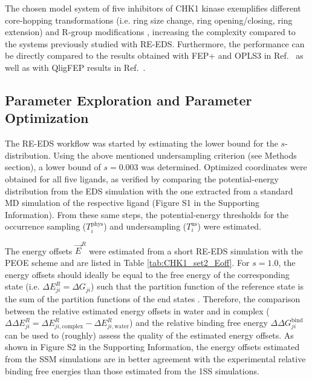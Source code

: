 The chosen model system of five inhibitors of CHK1 kinase exemplifies different core-hopping transformations (i.e. ring size change, ring opening/closing, ring extension) and R-group modifications \cite{Wang2017}, increasing the complexity compared to the systems previously studied with RE-EDS. Furthermore, the performance can be directly compared to the results obtained with FEP+ and OPLS3 in Ref.~\cite{Wang2017} as well as with QligFEP results in Ref.~\cite{Jespers2019}.

\subsection{Parameter Exploration and Parameter Optimization}
The RE-EDS workflow was started by estimating the lower bound for the $s$-distribution. Using the above mentioned undersampling criterion (see Methods section), a lower bound of $s=0.003$ was determined. 
Optimized coordinates were obtained for all five ligands, as verified by comparing the potential-energy distribution from the EDS simulation with the one extracted from a standard MD simulation of the respective ligand (Figure S1 in the Supporting Information). %
From these same steps, the potential-energy thresholds for the occurrence sampling ($T_{i}^{\text{phys}}$) and undersampling ($T_{i}^{\text{us}}$) were estimated.

The energy offsets $\vec{E}^R$ were estimated from a short RE-EDS simulation with the PEOE \cite{Sidler2016} scheme and are listed in Table \ref{tab:CHK1_set2_Eoff}.
For $s=1.0$, the energy offsets should ideally be equal to the free energy of the corresponding state (i.e. $\Delta E^R_{ji} = \Delta G_{ji}$) such that the partition function of the reference state is the sum of the partition functions of the end states \cite{Christ2008}. Therefore, the comparison between the relative estimated energy offsets in water and in complex ($\Delta \Delta E^R_{ji} = \Delta E^R_{ji,\text{complex}} - \Delta E^R_{ji,\text{water}}$) and the relative binding free energy $\Delta \Delta G^\text{bind}_{ji}$ can be used to (roughly) assess the quality of the estimated energy offsets. As shown in Figure S2 in the Supporting Information, %
the energy offsets estimated from the SSM simulations are in better agreement with the experimental relative binding free energies than those estimated from the 1SS simulations.

